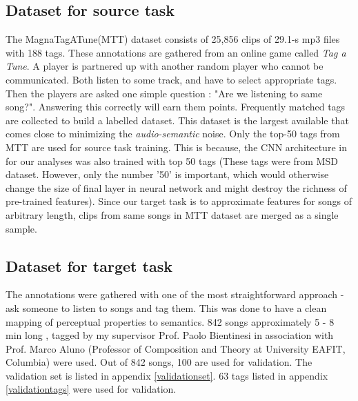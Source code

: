 \subsection{Dataset for source task}
\label{source}
The MagnaTagATune(MTT) dataset consists of 25,856 clips of 29.1-s mp3 files with 188 tags. These annotations are gathered from an online game called \textit{Tag a Tune}. A player is partnered up with another random player who cannot be communicated. Both listen to some track, and have to select appropriate tags. Then the players are asked one simple question : "Are we listening to same song?". Answering this correctly will earn them points. Frequently matched tags are collected to build a labelled dataset. This dataset is the largest available that comes close to minimizing the \textit{audio-semantic} noise. Only the top-50 tags from MTT are used for source task training. This is because, the CNN architecture in \cite{choi_cnn} for our analyses was also trained with top 50 tags (These tags were from MSD dataset. However, only the number '50' is important, which would otherwise change the size of final layer in neural network and might destroy the richness of pre-trained features). Since our target task is to approximate features for songs of arbitrary length, clips from same songs in MTT dataset are merged as a single sample.    

\subsection{Dataset for target task}
\label{target}
The annotations were gathered with one of the most straightforward approach - ask someone to listen to songs and tag them. This was done to have a clean mapping of perceptual properties to semantics. 842 songs approximately 5 - 8 min long , tagged by my supervisor Prof. Paolo Bientinesi in association with Prof. Marco Aluno (Professor of Composition and Theory at University EAFIT, Columbia) were used. Out of 842 songs, 100 are used for validation. The validation set is listed in appendix \ref{validationset}. 63 tags listed in appendix \ref{validationtags} were used for validation. 

